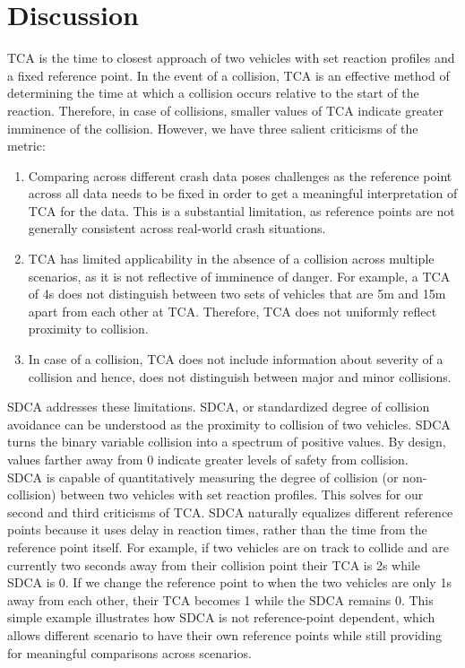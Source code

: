 \documentclass{article}
\begin{document}
\section{Discussion}
TCA is the time to closest approach of two vehicles with set reaction profiles and a fixed reference point. In the event of a collision, TCA is an effective method of determining the time at which a collision occurs relative to the start of the reaction. Therefore, in case of collisions, smaller values of TCA indicate greater imminence of the collision. However, we have three salient criticisms of the metric:
\begin{enumerate}
    \item Comparing across different crash data poses challenges as the reference point across all data needs to be fixed in order to get a meaningful interpretation of TCA for the data. This is a substantial limitation, as reference points are not generally consistent across real-world crash situations.
    \item TCA has limited applicability in the absence of a collision across multiple scenarios, as it is not reflective of imminence of danger. For example, a TCA of 4s does not distinguish between two sets of vehicles that are 5m and 15m apart from each other at TCA. Therefore, TCA does not uniformly reflect proximity to collision.
    \item In case of a collision, TCA does not include information about severity of a collision and hence, does not distinguish between major and minor collisions.
\end{enumerate}
SDCA addresses these limitations. SDCA, or standardized degree of collision avoidance can be understood as the proximity to collision of two vehicles. SDCA turns the binary variable collision into a spectrum of positive values. By design, values farther away from 0 indicate greater levels of safety from collision.\\ SDCA is capable of quantitatively measuring the degree of collision (or non-collision) between two vehicles with set reaction profiles. This solves for our second and third criticisms of TCA. SDCA naturally equalizes different reference points because it uses delay in reaction times, rather than the time from the reference point itself. For example, if two vehicles are on track to collide and are currently two seconds away from their collision point their TCA is 2s while SDCA is 0. If we change the reference point to when the two vehicles are only 1s away from each other, their TCA becomes 1 while the SDCA remains 0. This simple example illustrates how SDCA is not reference-point dependent, which allows different scenario to have their own reference points while still providing for meaningful comparisons across scenarios.\\
\end{document}
